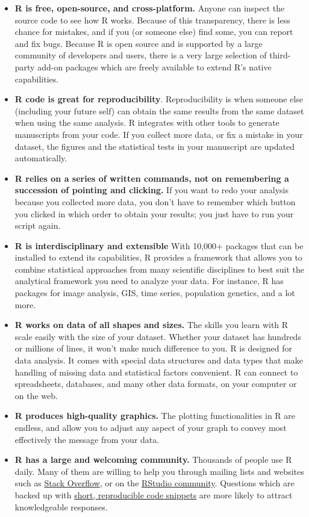 \documentclass[
  letterpaper,
  DIV=11,
  numbers=noendperiod]{scrreprt}
\begin{document}
\begin{itemize}
\item
  \textbf{R is free, open-source, and cross-platform.} Anyone can
  inspect the source code to see how R works. Because of this
  transparency, there is less chance for mistakes, and if you (or
  someone else) find some, you can report and fix bugs. Because R is
  open source and is supported by a large community of developers and
  users, there is a very large selection of third-party add-on packages
  which are freely available to extend R's native capabilities.
\item
  \textbf{R code is great for reproducibility}. Reproducibility is when
  someone else (including your future self) can obtain the same results
  from the same dataset when using the same analysis. R integrates with
  other tools to generate manuscripts from your code. If you collect
  more data, or fix a mistake in your dataset, the figures and the
  statistical tests in your manuscript are updated automatically.
\item
  \textbf{R relies on a series of written commands, not on remembering a
  succession of pointing and clicking.} If you want to redo your
  analysis because you collected more data, you don't have to remember
  which button you clicked in which order to obtain your results; you
  just have to run your script again.
\item
  \textbf{R is interdisciplinary and extensible} With 10,000+ packages
  that can be installed to extend its capabilities, R provides a
  framework that allows you to combine statistical approaches from many
  scientific disciplines to best suit the analytical framework you need
  to analyze your data. For instance, R has packages for image analysis,
  GIS, time series, population genetics, and a lot more.
\item
  \textbf{R works on data of all shapes and sizes.} The skills you learn
  with R scale easily with the size of your dataset. Whether your
  dataset has hundreds or millions of lines, it won't make much
  difference to you. R is designed for data analysis. It comes with
  special data structures and data types that make handling of missing
  data and statistical factors convenient. R can connect to
  spreadsheets, databases, and many other data formats, on your computer
  or on the web.
\item
  \textbf{R produces high-quality graphics.} The plotting
  functionalities in R are endless, and allow you to adjust any aspect
  of your graph to convey most effectively the message from your data.
\item
  \textbf{R has a large and welcoming community.} Thousands of people
  use R daily. Many of them are willing to help you through mailing
  lists and websites such as \href{https://stackoverflow.com/}{Stack
  Overflow}, or on the \href{https://community.rstudio.com/}{RStudio
  community}. Questions which are backed up with
  \href{https://www.tidyverse.org/help/}{short, reproducible code
  snippets} are more likely to attract knowledgeable responses.
\end{itemize}
\end{document}
